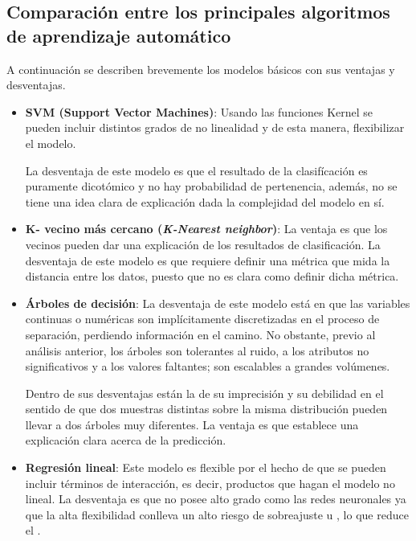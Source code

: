 \begin{figure}[H]
	\centering
	
	\label{fig:decision-tree}
\end{figure}


\subsection{Comparación entre los principales algoritmos de aprendizaje automático}
A continuación se describen brevemente los modelos básicos con sus ventajas y desventajas.

\begin{itemize}
\item \textbf{SVM (Support Vector Machines)}: Usando las funciones Kernel se pueden incluir distintos grados de no linealidad y de esta manera, ﬂexibilizar el modelo.

La desventaja de este modelo es que el resultado de la clasifícación es puramente dicotómico y no hay probabilidad de pertenencia, además, no se tiene una idea clara de explicación dada la complejidad del modelo en sí.

\item \textbf{K- vecino más cercano (\textit{K-Nearest neighbor})}: La ventaja es que los vecinos pueden dar una explicación de los resultados de clasificación. La desventaja de este modelo es que requiere definir una métrica que mida la distancia entre los datos, puesto que no es clara como definir dicha métrica.

\item \textbf{Árboles de decisión}: La desventaja de este modelo está en que las variables continuas o numéricas son implícitamente discretizadas en el proceso de separación, perdiendo información en el camino. No obstante, previo al análisis anterior, los árboles son tolerantes al ruido, a los atributos no signiﬁcativos y a los valores faltantes; son escalables a grandes volúmenes.

Dentro de sus desventajas están la de su imprecisión y su debilidad en el sentido de que dos muestras distintas sobre la misma distribución pueden llevar a dos árboles muy diferentes. La ventaja es que establece una explicación clara acerca de la predicción.

\item \textbf{Regresión lineal}: Este modelo es ﬂexible por el hecho de que se pueden incluir términos de interacción, es decir, productos que hagan el modelo no lineal. La desventaja es que no posee alto grado como las redes neuronales ya que la alta flexibilidad conlleva un alto riesgo de sobreajuste u , lo que reduce el .

\end{itemize}


